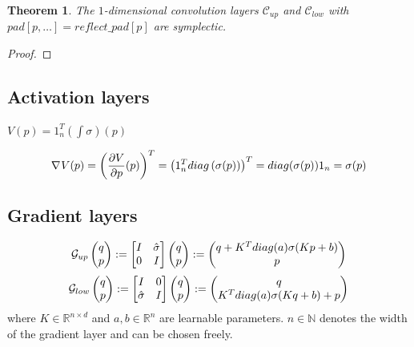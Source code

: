 \documentclass[twoside,a4paper]{article}
\newtheorem{theorem}{Theorem}
\begin{document}
\begin{theorem}
	The $1$-dimensional convolution layers $\mathcal{C}_{up}$ and $\mathcal{C}_{low}$
	with $pad[p,\dots] = reflect\_pad[p]$ are symplectic.
\end{theorem}
\begin{proof}
\end{proof}

\subsection{Activation layers}

$V(p) = 1_n^T(\int \sigma)(p)$

\begin{equation*}
	\nabla_{}{V}(p) = \left(\frac{\partial V}{\partial p}(p)\right)^T = \left(1_n^Tdiag\left(\sigma(p)\right)\right)^T
	= diag(\sigma(p)) 1_n
	= \sigma(p)
\end{equation*}


\subsection{Gradient layers}

\begin{equation*}
	\mathcal{G}_{up} \begin{pmatrix} q \\ p \end{pmatrix} := \begin{bmatrix} I & {\hat{\sigma}} \\ 0 & I \end{bmatrix} \begin{pmatrix} q \\ p \end{pmatrix} := \begin{pmatrix}
		q + K^T diag(a) \sigma(Kp + b) \\
		p
	\end{pmatrix}
\end{equation*}
\begin{equation*}
	\mathcal{G}_{low} \begin{pmatrix} q \\ p \end{pmatrix} := \begin{bmatrix} I & 0 \\ {\hat{\sigma}} & I \end{bmatrix} \begin{pmatrix} q \\ p \end{pmatrix} := \begin{pmatrix}
		q \\
		K^T diag(a) \sigma(Kq + b) + p
	\end{pmatrix}
\end{equation*}
where $K \in \mathbb{R}^{n \times d}$ and $a,b \in \mathbb{R}^n$
are learnable parameters.
$n \in \mathbb{N}$ denotes the width of the gradient layer and can be chosen freely.
\end{document}
